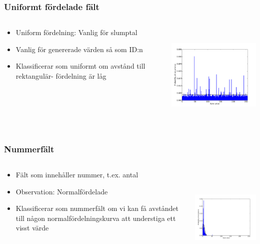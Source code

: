 \documentclass[xetex]{beamer}
\begin{document}
    \begin{frame}
        \frametitle{Uniformt fördelade fält}
        \begin{columns}[t]
            \begin{column}[T]{6cm}
                \begin{itemize}
                    \item Uniform fördelning: Vanlig för slumptal
                    \item Vanlig för genererade värden så som ID:n
                    \item Klassificerar som uniformt om avstånd till 
                        rektangulär- fördelning är låg
                \end{itemize}
            \end{column}
            \begin{column}[T]{6cm}
                \includegraphics[height=5cm]{img/uniform.pdf}
            \end{column}
        \end{columns}
    \end{frame}
    \begin{frame}
        \frametitle{Nummerfält}
        \begin{columns}[t]
            \begin{column}[T]{6cm}
                \begin{itemize}
                    \item Fält som innehåller nummer, t.ex. antal
                    \item Observation: Normalfördelade
                    \item Klassificerar som nummerfält om vi kan få avståndet
                        till någon normalfördelningskurva att understiga ett
                        visst värde
                \end{itemize}
            \end{column}
            \begin{column}[T]{6cm}
                \includegraphics[height=5cm]{img/number.pdf}
            \end{column}
        \end{columns}
    \end{frame}
\end{document}
